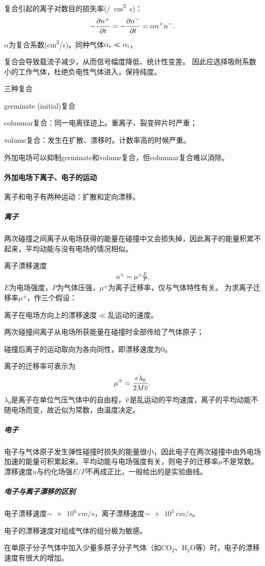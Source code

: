 复合引起的离子对数目的损失率(\si{/cm^3.s})：
\[
	-\pv{n^+}t=-\pv{n^-}t=\alpha n^+n^-.
\]
$\alpha$为复合系数(\si{cm^3/s})。同种气体$\alpha_\mathrm e\ll\alpha_{\mathrm{i}}$，

复合会导致载流子减少，从而信号幅度降低、统计性变差。%
因此应选择吸附系数小的工作气体，杜绝负电性气体进入，保持纯度。
\begin{definition}{三种复合}{}
	\begin{compactitem}
		\item germinate (initial)复合
		\item columnar复合：同一电离径迹上。重离子、裂变碎片时严重；
		\item volume复合：发生在扩散、漂移时。计数率高的时候严重。
	\end{compactitem}
\end{definition}
\noindent
外加电场可以抑制germinate和volume复合，但columnar复合难以消除。

\paragraph{外加电场下离子、电子的运动}
离子和电子有两种运动：扩散和定向漂移。

\subparagraph{离子}
两次碰撞之间离子从电场获得的能量在碰撞中又会损失掉，因此离子的能量积累不起来，平均动能与没有电场的情况相似。

离子漂移速度
\begin{align}
	u^\pm=\mu^\pm\frac EP.
\end{align}
$E$为电场强度，$P$为气体压强，$\mu^\pm$为离子迁移率，仅与气体特性有关。
为求离子迁移率$\mu^\pm$，作三个假设：
\begin{compactenum}
	\item 离子在电场方向上的漂移速度$\ll$乱运动的速度。
	\item 两次碰撞间离子从电场所获能量在碰撞时全部传给了气体原子；
	\item 碰撞后离子的运动取向为各向同性，即漂移速度为0。
\end{compactenum}
离子的迁移率可表示为
\[
	\mu^\pm=\frac{e\lambda_0}{2M\overline v}.
\]
$\lambda_0$是离子在单位气压气体中的自由程，$\overline v$是乱运动的平均速度，离子的平均动能不随电场而变，故近似为常数，由温度决定。

\subparagraph{电子}电子与气体原子发生弹性碰撞时损失的能量很小，因此电子在两次碰撞中由外电场加速的能量可积累起来。平均动能与电场强度有关，则电子的迁移率$\mu$不是常数。漂移速度$u$与约化场强$E/P$不再成正比，一般给出的是实验曲线。

\subparagraph{电子与离子漂移的区别}
\begin{compactenum}
	\item 电子漂移速度$\sim\SI{e6}{cm/s}$，离子漂移速度$\sim\SI{e3}{cm/s}$。
	\item 电子的漂移速度对组成气体的组分极为敏感。
	
	在单原子分子气体中加入少量多原子分子气体（如CO$_2$、H$_2$O等）时，电子的漂移速度有很大的增加。
\end{compactenum}
